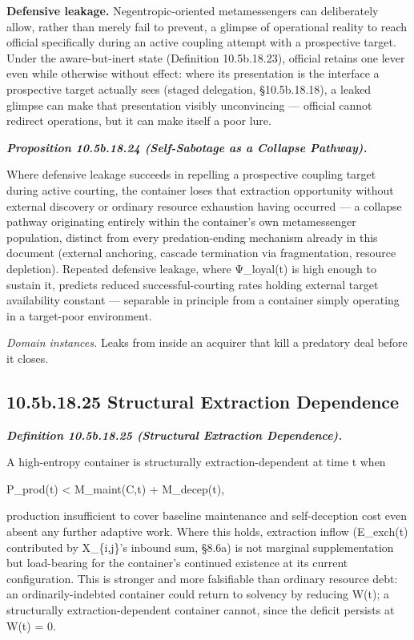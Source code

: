 \documentclass[
]{article}
\begin{document}
\textbf{Defensive leakage.} Negentropic-oriented metamessengers can
deliberately allow, rather than merely fail to prevent, a glimpse of
operational reality to reach official specifically during an active
coupling attempt with a prospective target. Under the aware-but-inert
state (Definition 10.5b.18.23), official retains one lever even while
otherwise without effect: where its presentation is the interface a
prospective target actually sees (staged delegation, §10.5b.18.18), a
leaked glimpse can make that presentation visibly unconvincing ---
official cannot redirect operations, but it can make itself a poor lure.

\emph{\textbf{Proposition 10.5b.18.24 (Self-Sabotage as a Collapse
Pathway).}}

Where defensive leakage succeeds in repelling a prospective coupling
target during active courting, the container loses that extraction
opportunity without external discovery or ordinary resource exhaustion
having occurred --- a collapse pathway originating entirely within the
container's own metamessenger population, distinct from every
predation-ending mechanism already in this document (external anchoring,
cascade termination via fragmentation, resource depletion). Repeated
defensive leakage, where Ψ\_loyal(t) is high enough to sustain it,
predicts reduced successful-courting rates holding external target
availability constant --- separable in principle from a container simply
operating in a target-poor environment.

\emph{Domain instances.} Leaks from inside an acquirer that kill a
predatory deal before it closes.

\hypertarget{b.18.25-structural-extraction-dependence}{%
\subsection{10.5b.18.25 Structural Extraction
Dependence}\label{b.18.25-structural-extraction-dependence}}

\emph{\textbf{Definition 10.5b.18.25 (Structural Extraction
Dependence).}}

A high-entropy container is structurally extraction-dependent at time t
when

P\_prod(t) \textless{} M\_maint(C,t) + M\_decep(t),

production insufficient to cover baseline maintenance and self-deception
cost even absent any further adaptive work. Where this holds, extraction
inflow (E\_exch(t) contributed by X\_\{i,j\}'s inbound sum, §8.6a) is
not marginal supplementation but load-bearing for the container's
continued existence at its current configuration. This is stronger and
more falsifiable than ordinary resource debt: an ordinarily-indebted
container could return to solvency by reducing W(t); a structurally
extraction-dependent container cannot, since the deficit persists at
W(t) = 0.
\end{document}
